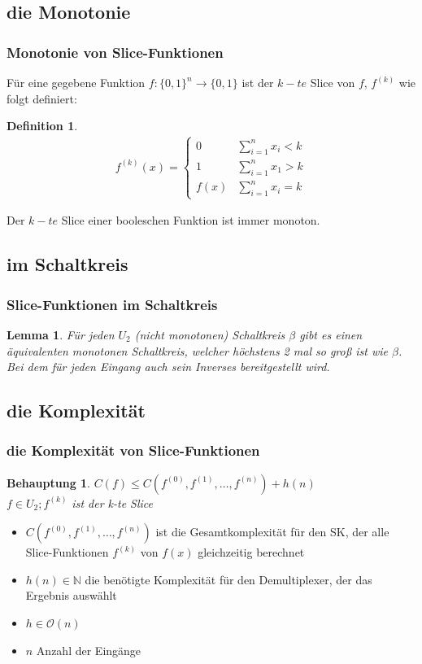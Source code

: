 \documentclass[hyperref={pdfpagelabels=false}]{beamer} %
\newtheorem{defin}{Definition}
\newtheorem{lem}{Lemma}
\newtheorem{beh}{Behauptung}
\begin{document}
  \subsection*{die Monotonie}
  \begin{frame}
    \frametitle{Monotonie von Slice-Funktionen}
    Für eine gegebene Funktion $f:\{0,1\}^n \rightarrow \{0,1\}$ ist der $k-te$ Slice von $f$, $f^{(k)}$ wie folgt definiert:\\
    \begin{defin}
      \begin{align*}
        f^{(k)}(x) =
        \begin{cases}
          0 & \sum\nolimits_{i=1}^{n} x_i < k\\
          1 & \sum\nolimits_{i=1}^{n} x_1 > k\\
          f(x) & \sum\nolimits_{i=1}^{n} x_i = k %
        \end{cases}
      \end{align*}
    \end{defin}
    Der $k-te$ Slice einer booleschen Funktion ist immer monoton.
  \end{frame}

  \subsection{im Schaltkreis}
  \begin{frame}%
    \frametitle{Slice-Funktionen im Schaltkreis}
    \begin{lem}
      Für jeden $U_2$ (nicht monotonen) Schaltkreis $\beta$ gibt es einen äquivalenten monotonen Schaltkreis, welcher höchstens
      2 mal so groß ist wie $\beta$. Bei dem f\"ur jeden Eingang auch sein Inverses bereitgestellt wird.
    \end{lem}
  \end{frame}

  \subsection{die Komplexität}
  \begin{frame}%
    \frametitle{die Komplexität von Slice-Funktionen}
    \begin{beh}
      $C(f) \leq C(f^{(0)}, f^{(1)}, \dots ,f^{(n)})+h(n)$\\
      $f \in U_2; f^{(k)}$ ist der k-te Slice
    \end{beh}
    \begin{itemize}
      \item $C(f^{(0)}, f^{(1)}, \dots ,f^{(n)})$ ist die Gesamtkomplexität für den SK, der alle Slice-Funktionen $f^{(k)}$ von $f(x)$ gleichzeitig berechnet
      \item $h(n) \in \mathbb{N}$ die benötigte Komplexität für den Demultiplexer, der das Ergebnis ausw\"ahlt
      \item $h \in \mathcal{O}(n)$
      \item $n$ Anzahl der Eingänge
    \end{itemize}
  \end{frame}
\end{document}
